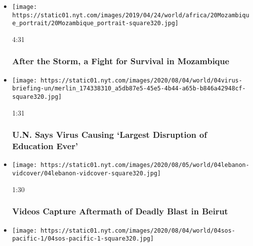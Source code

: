 \begin{itemize}
\item
  \href{https://www.nytimes.com/video/world/africa/100000006439514/mozambique-flood-cyclone-idai.html?action=click\&module=video-series-bar\&region=header\&pgtype=Article\&playlistId=video/world}{}

  \texttt{[image: https://static01.nyt.com/images/2019/04/24/world/africa/20Mozambique\_portrait/20Mozambique\_portrait-square320.jpg]}

  4:31

  \hypertarget{after-the-storm-a-fight-for-survival-in-mozambique}{%
  \subsubsection{After the Storm, a Fight for Survival in
  Mozambique}\label{after-the-storm-a-fight-for-survival-in-mozambique}}
\item
  \href{https://www.nytimes.com/video/us/100000007272762/un-secretary-generational-catastrophe-schools-reopen.html?action=click\&module=video-series-bar\&region=header\&pgtype=Article\&playlistId=video/world}{}

  \texttt{[image: https://static01.nyt.com/images/2020/08/04/world/04virus-briefing-un/merlin\_174338310\_a5db87e5-45e5-4b44-a65b-b846a42948cf-square320.jpg]}

  1:31

  \hypertarget{un-says-virus-causing-largest-disruption-of-education-ever}{%
  \subsubsection{U.N. Says Virus Causing `Largest Disruption of
  Education
  Ever'}\label{un-says-virus-causing-largest-disruption-of-education-ever}}
\item
  \href{https://www.nytimes.com/video/world/100000007272075/lebanon-beirut-blast.html?action=click\&module=video-series-bar\&region=header\&pgtype=Article\&playlistId=video/world}{}

  \texttt{[image: https://static01.nyt.com/images/2020/08/05/world/04lebanon-vidcover/04lebanon-vidcover-square320.jpg]}

  1:30

  \hypertarget{videos-capture-aftermath-of-deadly-blast-in-beirut}{%
  \subsubsection{Videos Capture Aftermath of Deadly Blast in
  Beirut}\label{videos-capture-aftermath-of-deadly-blast-in-beirut}}
\item
  \texttt{[image: https://static01.nyt.com/images/2020/08/04/world/04sos-pacific-1/04sos-pacific-1-square320.jpg]}


\end{itemize}
